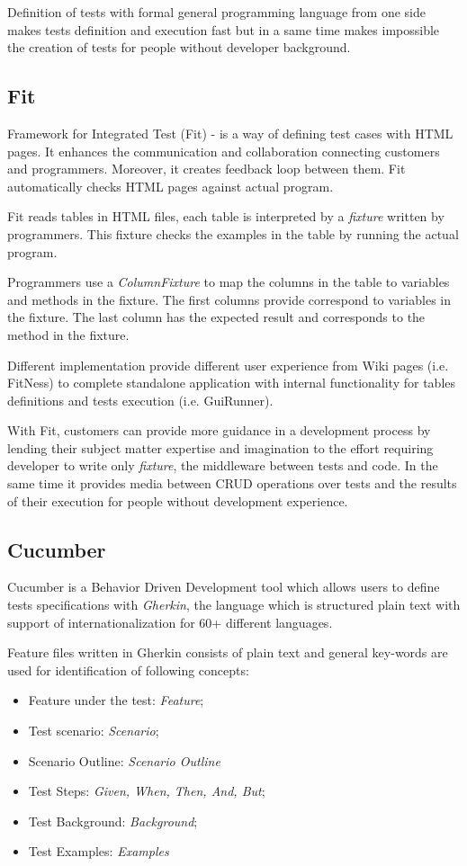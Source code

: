 Definition of tests with formal general programming language from one side makes tests definition and execution fast but in a same time makes impossible the creation of tests for people without developer background. 

\subsection{Fit}
Framework for Integrated Test (Fit) - is a way of defining test cases with HTML pages. It enhances the communication and collaboration connecting customers and programmers. Moreover, it creates feedback loop between them. Fit automatically checks HTML pages against actual program\cite{fit}.

Fit reads tables in HTML files, each table is interpreted by a \textit{fixture} written by programmers. This fixture checks the examples in the table by running the actual program\cite{fitIntro}.

Programmers use a \textit{ColumnFixture} to map the columns in the table to variables and methods in the fixture. The first columns provide correspond to variables in the fixture. The last column has the expected result and corresponds to the method in the fixture\cite{fitIntro}.

Different implementation provide different user experience from Wiki pages (i.e. FitNess) to complete standalone application with internal functionality for tables definitions and tests execution (i.e. GuiRunner).

With Fit, customers can provide more guidance in a development process by lending their subject matter expertise and imagination to the effort\cite{fit} requiring developer to write only \textit{fixture}, the middleware between tests and code. In the same time it provides media between  CRUD operations over tests and the results of their execution for people without development experience.

\subsection{Cucumber}
Cucumber is a Behavior Driven Development tool which allows users to define tests specifications with \textit{Gherkin}, the language which is structured plain text with support of internationalization for 60+ different languages\cite{cuceRef}.

Feature files written in Gherkin consists of plain text and general key-words are used for identification of following concepts:
\begin{itemize}
	\item Feature under the test: \textit{Feature};
	\item Test scenario: \textit{Scenario};
	\item Scenario Outline: \textit{Scenario Outline}
	\item Test Steps: \textit{Given, When, Then, And, But};
	\item Test Background:  \textit{Background};
	\item Test Examples: \textit{Examples}
\end{itemize}

